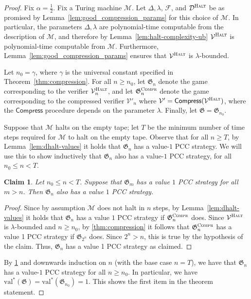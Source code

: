 \documentclass[11pt]{article}
\newtheorem{claim}[theorem]{Claim}
\theoremstyle{definition}
\newcommand{\val}{\ensuremath{\mathrm{val}}}
\newcommand{\game}{\mathfrak{G}}
\newcommand{\decider}{\mathcal{D}}
\newcommand{\verifier}{\mathcal{V}}
\newcommand{\compr}{\textsc{Compr}}
\newcommand{\halt}{\textsc{Halt}}
\newcommand{\machine}{\cal{M}}
\renewcommand{\cal}[1]{\mathcal{#1}}
\newcommand{\tmstyle}[1]{\ensuremath{\mathsf{#1}}}
\newcommand{\Compress}{\tmstyle{Compress}}
\begin{document}
\begin{proof}
	Fix $\alpha = \frac{1}{2}$.
  Fix a Turing machine $\machine$.
  Let $\Delta, \lambda$, $\cal{F}$, and $\decider^\halt$ be as promised by
  Lemma~\ref{lem:good_compression_params} for this choice of $\machine$.
  In particular, the parameters $\Delta, \lambda$ are polynomial-time computable
  from the description of $\cal{M}$, and therefore by
  Lemma~\ref{lem:halt-complexity-ub} $\verifier^\halt$ is polynomial-time
  computable from $\cal{M}$.
  Furthermore, Lemma~\ref{lem:good_compression_params} ensures that
  $\verifier^\halt$ is $\lambda$-bounded.

  Let $n_0 = \gamma$, where $\gamma$ is the universal
  constant specified in Theorem~\ref{thm:compression}.
  For all $n \geq n_0$, let $\game_n$ denote the game corresponding to the
  verifier $\verifier^\halt_n$, and let $\game^\compr_n$ denote the game
  corresponding to the compressed verifier $\verifier'_n$ where $\verifier' =
  \Compress(\verifier^\halt)$, where the $\Compress$ procedure
  depends on the parameter $\lambda$.
  Finally, let $\game = \game_{n_0}$.
		
  Suppose that $\machine$ halts on the empty tape; let $T$ be the minimum number
  of time steps required for $\machine$ to halt on the empty tape.
  Observe that for all $n \geq T$, by Lemma~\ref{lem:dhalt-values} it holds that
  $\game_n$ has a value-$1$ PCC strategy.
  We will use this to show inductively that $\game_n$ also has a value-$1$ PCC
  strategy, for all $ n_0 \leq n < T$.

  \begin{claim}
    Let $ n_0 \leq n < T$. Suppose that $\game_{m}$ has a value $1$ PCC
    strategy for all
    $m > n$. Then $\game_n$ also has a value $1$ PCC strategy.
    \label{claim:induction-game}
  \end{claim}
  \begin{proof}
    Since by assumption $\cal{M}$ does not halt in $n$ steps, by
    Lemma~\ref{lem:dhalt-values} it holds that $\game_n$ has a value $1$ PCC
    strategy if $\game^{\compr}_n$ does.
    Since $\verifier^\halt$ is $\lambda$-bounded and $n \geq n_0$, by
    \cref{thm:compression} it follows that $\game^{\compr}_n$ has a value 1 PCC
    strategy if $\game_{2^n}$ does.
    Since $2^n > n$, this is true by the hypothesis of the claim.
    Thus, $\game_n$ has a value 1 PCC strategy as claimed.
  \end{proof}
  By \cref{claim:induction-game} and downwards induction on $n$ (with the base
  case $n = T$), we have that $\game_n$ has a value-$1$ PCC strategy for all $n
  \geq n_0$.
  In particular, we have $\val^*(\game) = \val^*(\game_{n_0}) = 1$.
  This shows the first item in the theorem statement.


\end{proof}
\end{document}
